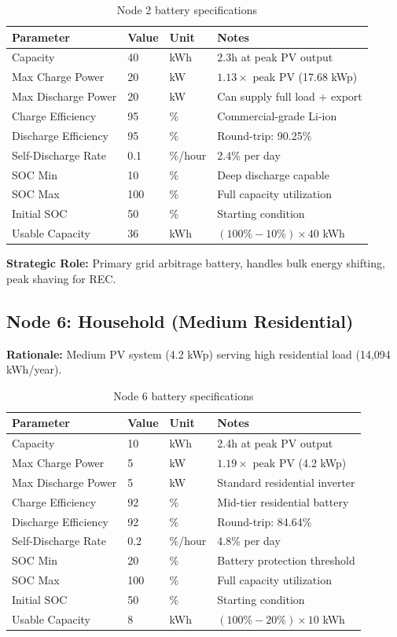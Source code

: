 \documentclass[11pt,a4paper]{article}
\begin{document}
\begin{table}[h]
\centering
\small
\begin{tabular}{@{}llll@{}}
\toprule
\textbf{Parameter} & \textbf{Value} & \textbf{Unit} & \textbf{Notes} \\ 
\midrule
Capacity & 40 & kWh & 2.3h at peak PV output \\
Max Charge Power & 20 & kW & $1.13\times$ peak PV (17.68 kWp) \\
Max Discharge Power & 20 & kW & Can supply full load + export \\
Charge Efficiency & 95 & \% & Commercial-grade Li-ion \\
Discharge Efficiency & 95 & \% & Round-trip: 90.25\% \\
Self-Discharge Rate & 0.1 & \%/hour & 2.4\% per day \\
SOC Min & 10 & \% & Deep discharge capable \\
SOC Max & 100 & \% & Full capacity utilization \\
Initial SOC & 50 & \% & Starting condition \\
Usable Capacity & 36 & kWh & $(100\% - 10\%) \times 40$ kWh \\
\bottomrule
\end{tabular}
\caption{Node 2 battery specifications}
\end{table}

\textbf{Strategic Role:} Primary grid arbitrage battery, handles bulk energy shifting, peak shaving for REC.

\subsection{Node 6: Household (Medium Residential)}

\textbf{Rationale:} Medium PV system (4.2 kWp) serving high residential load (14,094 kWh/year).

\begin{table}[h]
\centering
\small
\begin{tabular}{@{}llll@{}}
\toprule
\textbf{Parameter} & \textbf{Value} & \textbf{Unit} & \textbf{Notes} \\ 
\midrule
Capacity & 10 & kWh & 2.4h at peak PV output \\
Max Charge Power & 5 & kW & $1.19\times$ peak PV (4.2 kWp) \\
Max Discharge Power & 5 & kW & Standard residential inverter \\
Charge Efficiency & 92 & \% & Mid-tier residential battery \\
Discharge Efficiency & 92 & \% & Round-trip: 84.64\% \\
Self-Discharge Rate & 0.2 & \%/hour & 4.8\% per day \\
SOC Min & 20 & \% & Battery protection threshold \\
SOC Max & 100 & \% & Full capacity utilization \\
Initial SOC & 50 & \% & Starting condition \\
Usable Capacity & 8 & kWh & $(100\% - 20\%) \times 10$ kWh \\
\bottomrule
\end{tabular}
\caption{Node 6 battery specifications}
\end{table}
\end{document}
